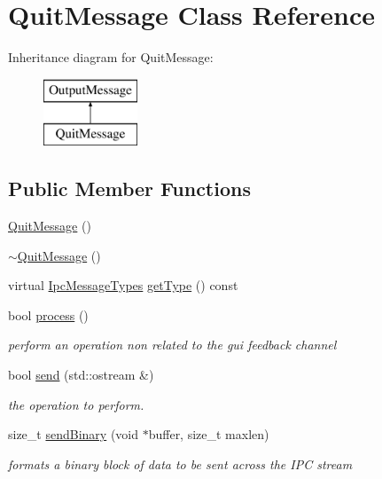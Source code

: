 \hypertarget{class_quit_message}{}\section{Quit\+Message Class Reference}
\label{class_quit_message}
Inheritance diagram for Quit\+Message\+:\begin{figure}[H]
\begin{center}
\leavevmode
\includegraphics[height=2.000000cm]{d6/d6e/class_quit_message}
\end{center}
\end{figure}
\subsection*{Public Member Functions}
\begin{DoxyCompactItemize}
\item 
\mbox{\hyperlink{class_quit_message_a282aad21d179d720b75820780e596663}{Quit\+Message}} ()
\item 
\mbox{\hyperlink{class_quit_message_a9a3b49405ba6fab65736ec15d6c3640e}{$\sim$\+Quit\+Message}} ()
\item 
virtual \mbox{\hyperlink{ipcmsgtypes_8h_a59f75a61492e64aebfae0cc49cc26683}{Ipc\+Message\+Types}} \mbox{\hyperlink{class_quit_message_aacd6dd8d6b63c685151bfd54c1edc990}{get\+Type}} () const
\item 
bool \mbox{\hyperlink{class_quit_message_a780765be639ff408f1d1acf2f5eef851}{process}} ()
\begin{DoxyCompactList}\small\item\em perform an operation non related to the gui feedback channel \end{DoxyCompactList}\item 
bool \mbox{\hyperlink{class_quit_message_ae1039b9a8fc00712a8161a3701f1fa2f}{send}} (std\+::ostream \&)
\begin{DoxyCompactList}\small\item\em the operation to perform. \end{DoxyCompactList}\item 
size\+\_\+t \mbox{\hyperlink{class_quit_message_ae36862391f3a9f21a67a76074e082fe6}{send\+Binary}} (void $\ast$buffer, size\+\_\+t maxlen)
\begin{DoxyCompactList}\small\item\em formats a binary block of data to be sent across the I\+PC stream \end{DoxyCompactList}\end{DoxyCompactItemize}


